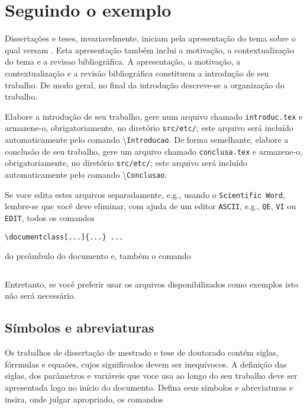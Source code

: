 
\chapter{Seguindo o exemplo\label{cap2}}

Dissertações e teses, invariavelmente, iniciam pela
apresentação do tema sobre o qual versam \cite{SP}. Esta
apresentação também inclui a motivação, a
contextualização do tema e a revisao bibliográfica. A
apresentação, a motivação, a contextualização e a
revisão bibliográfica constituem a introdução de seu trabalho.
De modo geral, no final da introdução descreve-se a
organização do trabalho.

Elabore a introdução de seu trabalho, gere num
arquivo chamado \texttt{introduc.tex} e armazene-o, obrigatoriamente, no diretório \texttt{src/etc/}; este arquivo será incluído automaticamente pelo comando \textbackslash\texttt{Introducao}. De forma semelhante, elabore a conclusão de seu trabalho, gere um arquivo chamado \texttt{conclusa.tex} e armazene-o, obrigatoriamente, no diretório \texttt{src/etc/}; este arquivo será incluído automaticamente pelo comando \textbackslash\texttt{Conclusao}. 

Se voce edita estes arquivos separadamente, e.g., usando o \texttt{Scientific Word}, lembre-se que você deve eliminar, com ajuda de um editor \texttt{ASCII},
e.g., \texttt{QE}, \texttt{VI} ou \texttt{EDIT}, todos os comandos
\begin{verbatim}
\documentclass[...]{...} ... 
\end{verbatim}
\noindent do preâmbulo do documento e, também o comando
\begin{verbatim}

\end{verbatim}

Entretanto, se você preferir usar os arquivos disponibilizados como exemplos isto não será necessário.

\section{Símbolos e abreviaturas}

Os trabalhos de dissertação de mestrado e tese de doutorado contém
siglas, fórrmulas e equaões, cujos significados devem ser
inequívocos. A definição das siglas, dos parâmetros e
variáveis que voce usa ao longo do seu trabalho deve ser apresentada logo
no início do documento. Defina seus símbolos e abreviaturas e
insira, onde julgar apropriado, os comandos

